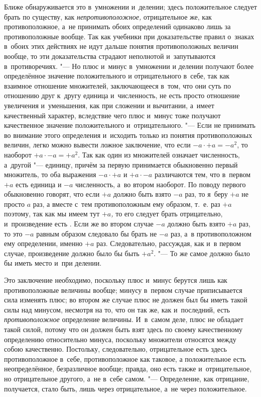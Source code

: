 Ближе обнаруживается это в~умножении и~делении; здесь положительное следует
брать по существу, как {\em непротивоположное,}
отрицательное же, как противоположное, а~не принимать обоих определений
одинаково лишь за противоположные вообще. Так как учебники при
доказательстве правил о~знаках в~обоих этих действиях не идут дальше
понятия противоположных величин вообще, то эти доказательства страдают
неполнотой и~запутываются в~противоречиях. "--- Но плюс и~минус в~умножении и
делении получают более определённое значение положительного и
отрицательного в~себе, так как взаимное отношение множителей, заключающееся
в~том, что они суть по отношению друг к~другу единица и~численность, не
есть просто отношение увеличения и~уменьшения, как при сложении и
вычитании, а~имеет качественный характер, вследствие чего плюс и~минус тоже
получают качественное значение положительного и~отрицательного. "--- Если не
принимать во внимание этого определения и~исходить только из понятия
противоположных величин, легко можно вывести ложное заключение, что если
$-a\cdot+a=-a^2$, то наоборот $+a\cdot-a=+a^2$. Так как один из множителей
означает численность, а~другой "--- единицу, причём за первую принимается
обыкновенно первый множитель,
то оба выражения $-a\cdot+a$ и $+a\cdot-a$ различаются тем,
что в~первом $+a$ есть единица и $-a$ численность, а~во втором наоборот.
По поводу первого обыкновенно говорят, что если $+a$ должно
быть взято $-a$ раз, то я~беру $+a$ не просто $a$ раз, а
вместе с~тем противоположным ему образом, т.~е. раз $+a$
поэтому, так как мы имеем тут {\em $+a$,} то его следует
брать отрицательно, и~произведение есть . Если же во втором случае
$-a$ должно быть взято $+a$ раз, то это $-a$
равным образом следовало бы брать не $-a$ раз, а~в
противоположном ему определении, именно $+a$ раз.
Следовательно, рассуждая, как и~в первом случае, произведение должно было
бы быть $+a^2$. "--- То же самое должно было бы иметь место и~при делении.

Это заключение необходимо, поскольку плюс и~минус берутся лишь как
противоположные величины вообще; минусу в~первом случае приписывается сила
изменять плюс; во втором же случае плюс не должен был бы иметь такой силы
над минусом, несмотря на то, что он так же, как и~последний, есть
{\em противоположное} определение величины. И~в~самом
деле, плюс не обладает такой силой, потому что он должен быть взят здесь по
своему качественному определению относительно минуса, поскольку множители
относятся между собою качественно. Постольку, следовательно, отрицательное
есть здесь противоположное в~себе, противоположное как таковое, а
положительное есть неопределённое, безразличное вообще; правда, оно есть
также и~отрицательное, но отрицательное другого, а~не в~себе самом. "---
Определение, как отрицание, получается, стало быть, лишь через
отрицательное, а~не через положительное.

